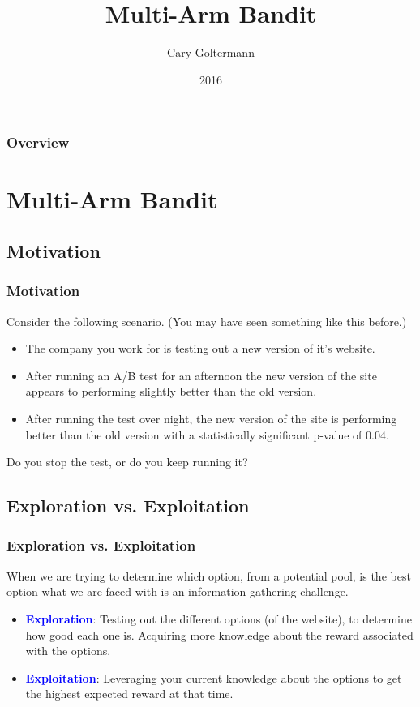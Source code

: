 \documentclass{beamer}
\title{Multi-Arm Bandit}
\author{Cary Goltermann}
\institute{Galvanize}
\date{2016}
\begin{document}
\frame{\titlepage}

\begin{frame}
  \frametitle{Overview}
  \tableofcontents[]
\end{frame}

\section{Multi-Arm Bandit}
\subsection{Motivation}
\begin{frame}
  \frametitle{Motivation}
  Consider the following scenario. (You may have seen something like this before.) \vspace{2mm}
  \begin{itemize}
    \item The company you work for is testing out a new version of it's website. \pause
    \item After running an A/B test for an afternoon the new version of the site appears to performing slightly better than the old version. \pause
    \item After running the test over night, the new version of the site is performing better than the old version with a statistically significant p-value of 0.04. \pause
  \end{itemize} \vspace{3mm}

  Do you stop the test, or do you keep running it?
\end{frame}

\subsection{Exploration vs. Exploitation}
\begin{frame}
  \frametitle{Exploration vs. Exploitation}
  When we are trying to determine which option, from a potential pool, is the best option what we are faced with is an information gathering challenge. \vspace{2mm} \pause
  \begin{itemize}
    \item \textbf{\textcolor{blue}{Exploration}}: Testing out the different options (of the website), to determine how good each one is. Acquiring more knowledge about the reward associated with the options. \pause
    \item \textbf{\textcolor{blue}{Exploitation}}: Leveraging your current knowledge about the options to get the highest expected reward at that time.
  \end{itemize}
\end{frame}
\end{document}
